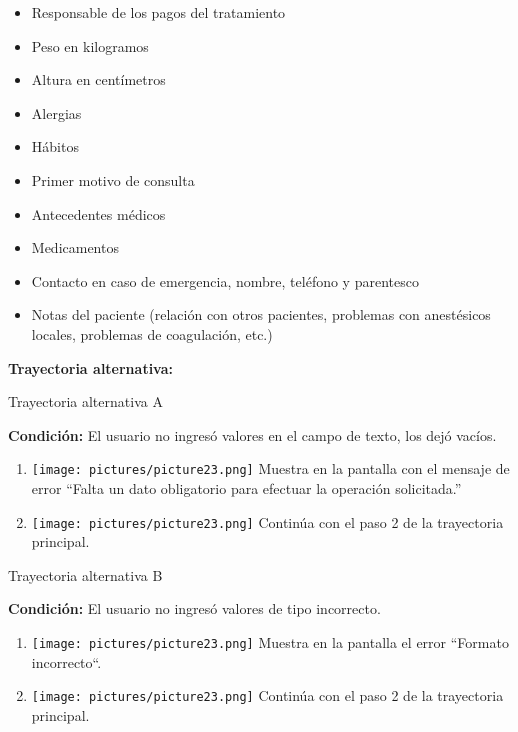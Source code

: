 \begin{enumerate}
      \begin{itemize}[nosep]
      \item Responsable de los pagos del tratamiento
      \item Peso en kilogramos
      \item Altura en centímetros
      \item Alergias
      \item Hábitos
      \item Primer motivo de consulta
      \item Antecedentes médicos
      \item Medicamentos
      \item Contacto en caso de emergencia, nombre, teléfono y parentesco
      \item Notas del paciente (relación con otros pacientes, problemas con anestésicos locales, problemas de coagulación, etc.)
      \end{itemize}
\end{enumerate}

\textbf{Trayectoria alternativa:} 
{\large Trayectoria alternativa A \par}
\vspace{0.3em}
\textbf{Condición:} El usuario no ingresó valores en el campo de texto, los dejó vacíos.
\begin{enumerate}
\item \texttt{[image: pictures/picture23.png]} Muestra en la pantalla con el mensaje de error ``Falta un dato obligatorio para efectuar la operación solicitada.''
\item \texttt{[image: pictures/picture23.png]} Continúa con el paso 2 de la trayectoria principal.
\end{enumerate}
{\large Trayectoria alternativa B \par}
\vspace{0.3em}
\textbf{Condición:} El usuario no ingresó valores de tipo incorrecto.
\begin{enumerate}
\item \texttt{[image: pictures/picture23.png]} Muestra en la pantalla el error ``Formato incorrecto``.
\item \texttt{[image: pictures/picture23.png]} Continúa con el paso 2 de la trayectoria principal.
\end{enumerate}


